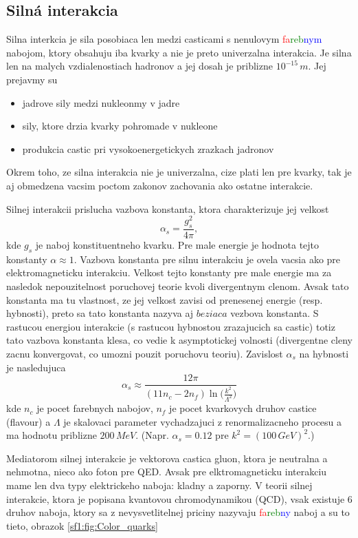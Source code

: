 \documentclass[../../main.tex]{subfiles}
\begin{document}
\subsection{Silná interakcia}
Silna interkcia je sila posobiaca len medzi casticami s nenulovym \textcolor{red}{fa}\textcolor{green}{reb}\textcolor{blue}{nym} nabojom, ktory obsahuju iba kvarky a nie je preto univerzalna interakcia. Je silna len na malych vzdialenostiach hadronov a jej dosah je priblizne $10^{-15}\,m$. Jej prejavmy su 
\begin{itemize}
	\item jadrove sily medzi nukleonmy v jadre  
	\item sily, ktore drzia kvarky pohromade v nukleone
	\item produkcia castic pri vysokoenergetickych zrazkach jadronov
\end{itemize}
Okrem toho, ze silna interakcia nie je univerzalna, cize plati len pre kvarky, tak je aj obmedzena vacsim poctom zakonov zachovania ako ostatne interakcie.\par
Silnej interakcii prislucha vazbova konstanta, ktora charakterizuje jej velkost
$$
\alpha_s= \frac{g_s^2}{4\pi},
$$
kde $g_s$ je naboj konstituentneho kvarku. Pre male energie je hodnota tejto konstanty $\alpha\approx 1$. Vazbova konstanta pre silnu interakciu je ovela vacsia ako pre elektromagneticku interakciu. Velkost tejto konstanty pre male energie ma za nasledok nepouzitelnost poruchovej teorie kvoli divergentnym clenom. Avsak tato konstanta ma tu vlastnost, ze jej velkost zavisi od prenesenej energie (resp. hybnosti), preto sa tato konstanta nazyva aj $beziaca$ vezbova konstanta. S rastucou energiou interakcie (s rastucou hybnostou zrazajucich sa castic) totiz tato vazbova konstanta klesa, co vedie k asymptotickej volnosti (divergentne cleny zacnu konvergovat, co umozni pouzit poruchovu teoriu). Zavislost $\alpha_s$ na hybnosti je nasledujuca
$$
\alpha_s\approx\frac{12\pi}{(11n_c-2n_f)\ln\big(\frac{k^2}{\Lambda^2}\big)}
$$ 
kde $n_c$ je pocet farebnych nabojov, $n_f$ je pocet kvarkovych druhov castice (flavour) a $\Lambda$ je skalovaci parameter vychadzajuci z renormalizacneho procesu a ma hodnotu priblizne $200\,MeV$. (Napr. $\alpha_s=0.12$ pre $k^2=(100\,GeV)^2$.)\par
Mediatorom silnej interakcie je vektorova castica gluon, ktora je neutralna a nehmotna, nieco ako foton pre QED. Avsak pre elktromagneticku interakciu mame len dva typy elektrickeho naboja: kladny a zaporny. V teorii silnej interakcie, ktora je popisana kvantovou chromodynamikou (QCD), vsak existuje 6 druhov naboja, ktory sa z nevysvetlitelnej priciny nazyvaju \textcolor{red}{fa}\textcolor{green}{reb}\textcolor{blue}{ny} naboj a su to tieto, obrazok \ref{sf1:fig:Color_quarks}
\end{document}

